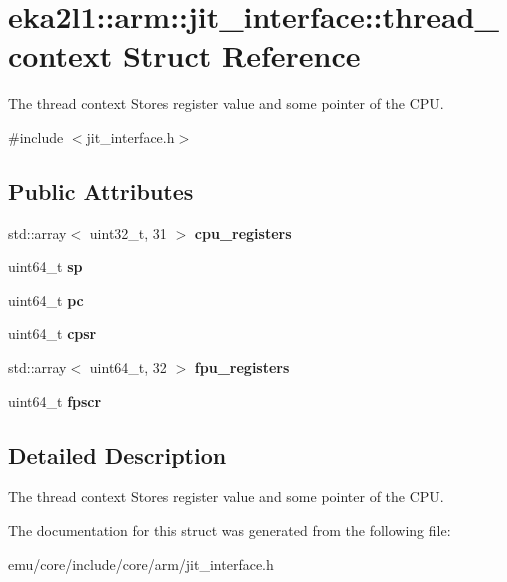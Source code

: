 \hypertarget{structeka2l1_1_1arm_1_1jit__interface_1_1thread__context}{}\section{eka2l1\+:\+:arm\+:\+:jit\+\_\+interface\+:\+:thread\+\_\+context Struct Reference}
\label{structeka2l1_1_1arm_1_1jit__interface_1_1thread__context}


The thread context Stores register value and some pointer of the C\+PU.  




{\ttfamily \#include $<$jit\+\_\+interface.\+h$>$}

\subsection*{Public Attributes}
\begin{DoxyCompactItemize}
\item 
\mbox{\label{structeka2l1_1_1arm_1_1jit__interface_1_1thread__context_af9934c239afc7920b21af29d07491390}} 
std\+::array$<$ uint32\+\_\+t, 31 $>$ {\bfseries cpu\+\_\+registers}
\item 
\mbox{\label{structeka2l1_1_1arm_1_1jit__interface_1_1thread__context_a21b7dd7c6cad45034910e9a3f8eac742}} 
uint64\+\_\+t {\bfseries sp}
\item 
\mbox{\label{structeka2l1_1_1arm_1_1jit__interface_1_1thread__context_ae05ace3d091e4a9eddc2081313666956}} 
uint64\+\_\+t {\bfseries pc}
\item 
\mbox{\label{structeka2l1_1_1arm_1_1jit__interface_1_1thread__context_a760ee30d079dafcb8ac538fb3e482f2e}} 
uint64\+\_\+t {\bfseries cpsr}
\item 
\mbox{\label{structeka2l1_1_1arm_1_1jit__interface_1_1thread__context_a585cc0a7cf5f6792bfb9f062c1c6d0b8}} 
std\+::array$<$ uint64\+\_\+t, 32 $>$ {\bfseries fpu\+\_\+registers}
\item 
\mbox{\label{structeka2l1_1_1arm_1_1jit__interface_1_1thread__context_aa911dd74aeeec45661a3d540a5e58b9a}} 
uint64\+\_\+t {\bfseries fpscr}
\end{DoxyCompactItemize}


\subsection{Detailed Description}
The thread context Stores register value and some pointer of the C\+PU. 

The documentation for this struct was generated from the following file\+:\begin{DoxyCompactItemize}
\item 
emu/core/include/core/arm/jit\+\_\+interface.\+h\end{DoxyCompactItemize}

